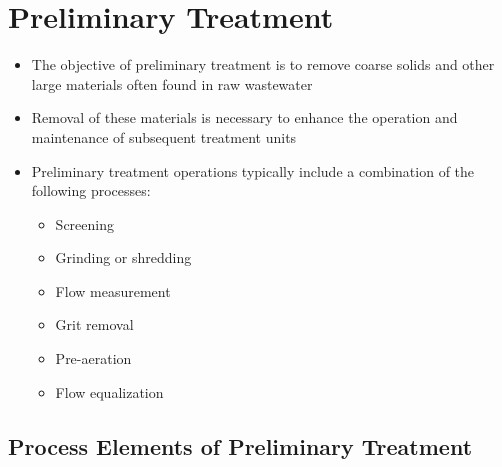 \documentclass{article}
\begin{document}
\newpage
\section{Preliminary Treatment}

			\begin{itemize}
				\item The objective of preliminary treatment is to remove coarse solids and other large materials often found in raw wastewater
				\item Removal of these materials is necessary to enhance the operation and maintenance of subsequent treatment units\\
				\item Preliminary treatment operations typically include a combination of the following processes:
					\begin{itemize}
						\item Screening
						\item Grinding or shredding
						\item Flow measurement
						\item Grit removal
						\item Pre-aeration
						\item Flow equalization
					\end{itemize}
			\end{itemize}

				
		\subsection{Process Elements of Preliminary Treatment}	
			
\end{document}
